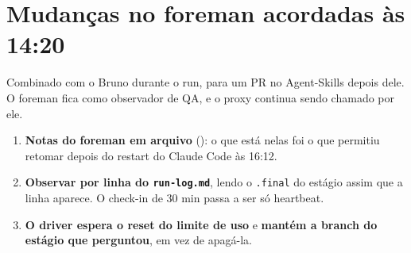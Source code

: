\documentclass[11pt,a4paper]{article}
\begin{document}
\section{Mudanças no foreman acordadas às 14:20}

Combinado com o Bruno durante o run, para um PR no Agent-Skills depois dele.
O foreman fica como observador de QA, e o proxy continua sendo chamado por
ele.
\begin{enumerate}
  \item \textbf{Notas do foreman em arquivo}
        (): o que está nelas foi o que
        permitiu retomar depois do restart do Claude Code às 16:12.
  \item \textbf{Observar por linha do \texttt{run-log.md}}, lendo o
        \texttt{.final} do estágio assim que a linha aparece. O check-in de 30
        min passa a ser só heartbeat.
  \item \textbf{O driver espera o reset do limite de uso} e \textbf{mantém a
        branch do estágio que perguntou}, em vez de apagá-la.
\end{enumerate}
\end{document}
